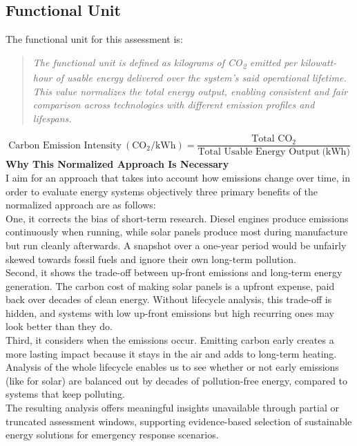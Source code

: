 \documentclass{article}
\begin{document}
\subsection{Functional Unit}

The functional unit for this assessment is:  
\begin{quote}
	\textit{The functional unit is defined as kilograms of CO\textsubscript{2} emitted per kilowatt-hour of usable energy delivered over the system's said operational lifetime. This value normalizes the total energy output, enabling consistent and fair comparison across technologies with different emission profiles and lifespans.}
\end{quote}
\vspace{1em}
\begin{equation}
\text{Carbon Emission Intensity}\ (\text{CO}_2/\text{kWh}) =\frac{\text{Total  CO}_2}{\text{Total Usable Energy Output}\ \text{(kWh)}}
\label{normalco}
\end{equation}
{\textbf{Why This Normalized Approach Is Necessary}}\\[8pt]
I aim for an approach that takes into account how emissions change over time, in order to evaluate energy systems objectively  three primary benefits of the normalized approach are as follows:\\[8pt]
One, it corrects the bias of short-term research. Diesel engines produce emissions continuously when running, while solar panels produce most during manufacture but run cleanly afterwards. A snapshot over a one-year period would be unfairly skewed towards fossil fuels and ignore their own long-term pollution.\\[8pt]
Second, it shows the trade-off between up-front emissions and long-term energy generation. The carbon cost of making solar panels is a upfront expense, paid back over decades of clean energy. Without lifecycle analysis, this trade-off is hidden, and systems with low up-front emissions but high recurring ones may look better than they do.\\[8pt]
Third, it considers when the emissions occur. Emitting carbon early creates a more lasting impact because it stays in the air and adds to long-term heating. Analysis of the whole lifecycle enables us to see whether or not early emissions (like for solar) are balanced out by decades of pollution-free energy, compared to systems that keep polluting.\\[8pt]
The resulting analysis offers meaningful insights unavailable through partial or truncated assessment windows, supporting evidence-based selection of sustainable energy solutions for emergency response scenarios.
\end{document}
